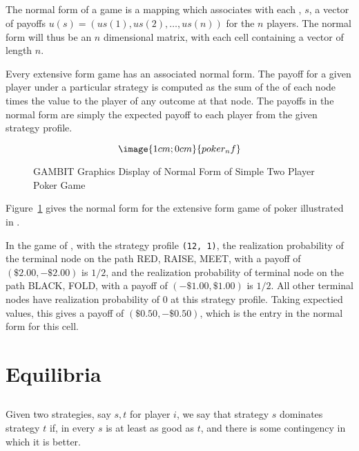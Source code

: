 \subsection{}\label{normformsec}
The normal form of a game is a mapping which associates with 
each , $s$, a vector of
 payoffs $u(s) = (u{s}(1), u{s}(2), \ldots , u{s}(n))$  for the $n$ players. 
 The normal form will thus be an $n$ dimensional matrix, with each cell 
containing a vector of length $n$.

Every extensive form game has an associated normal form.  The payoff for 
a given player under a particular strategy is computed as the sum of the 
 of each node times the 
value to the player of any outcome at that node.  The payoffs in the normal 
form are simply the expected payoff to each player from the given strategy
 profile.  

\begin{figure}
$$\image{1cm;0cm}{poker_nf}$$
\caption{GAMBIT Graphics Display of Normal Form of
		Simple Two Player Poker Game}\label{fig:samp2}
\end{figure}

Figure~\ref{fig:samp2}  gives the normal form for the extensive form game
 of poker illustrated in
. 

In the game of  , with the 
strategy profile {\tt (12, 1)}, the realization probability of the terminal
 node on the path RED, RAISE, MEET, with a payoff of $(\$2.00, -\$2.00)$
 is $1/2$, and the realization probability of terminal node on the path
 BLACK, FOLD, with a payoff of  $(-\$1.00, \$1.00)$ is $1/2$.    All other
 terminal nodes have realization probability of $0$ at this strategy profile.
 Taking expectied values, this gives a payoff of 
$(\$0.50, -\$0.50)$, which is the entry in the normal form for this cell.  

\section{Equilibria}

\subsection{}\label{domsec}
Given two strategies, say $s, t$ for player $i$, we say that strategy $s$ 
dominates strategy $t$ if, in every  $s$
 is at least as good as $t$, and there is some contingency in which it is 
better.  

